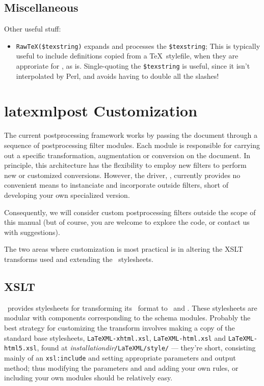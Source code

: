 \documentclass{book}
\newcommand{\ltxcode}{\lstinline[style=inlinelatexml]}
\begin{document}
\subsection{Miscellaneous}\label{customization.latexml.misc}
Other useful stuff:
\begin{itemize}
\item \ltxcode|RawTeX($texstring)| expands and processes the \ltxcode|$texstring|;
This is typically useful to include definitions copied from a \TeX\ stylefile,
when they are approriate for \LaTeXML, as is.
Single-quoting the \ltxcode|$texstring| is useful, since it isn't interpolated
by Perl, and avoids having to double all the slashes!
\end{itemize}


\section{latexmlpost Customization}\label{customization.latexmlpost}
The current postprocessing framework works by passing the document through
a sequence of postprocessing filter modules. Each module is responsible
for carrying out a specific transformation, augmentation or conversion
on the document.   In principle, this architecture has the flexibility to
employ new filters to perform new or customized conversions.
However, the driver, , currently provides no
convenient means to instanciate and incorporate outside filters, short
of developing your own specialized version.

Consequently, we will consider custom postprocessing filters outside
the scope of this manual (but of course, you are welcome to explore
the code, or contact us with suggestions).

The two areas where customization is most practical is in altering
the XSLT transforms used and extending the \CSS\ stylesheets.

\subsection{XSLT}\label{customization.latexmlpost.xslt}
\LaTeXML\ provides stylesheets for transforming its \XML\ format
to \XHTML\ and \HTML. These stylesheets are modular with components
corresponding to the schema modules.  Probably the best strategy
for customizing the transform involves making a copy of the standard
base stylesheets, \texttt{LaTeXML-xhtml.xsl},
\texttt{LaTeXML-html.xsl} and
\texttt{LaTeXML-html5.xsl},  found at
\textit{installationdir}\texttt{/LaTeXML/style/}
--- they're short, consisting mainly of an \texttt{xsl:include}
and setting appropriate parameters and output method;
thus modifying the parameters and and adding your own rules,
or including your own modules should be relatively easy.
\end{document}
